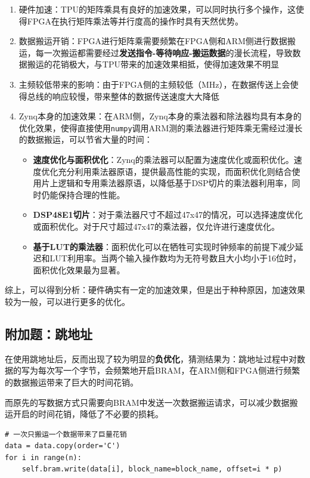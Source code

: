 \documentclass[12pt,a4paper]{article}
\begin{document}
\begin{enumerate}
\item
  硬件加速：TPU的矩阵乘具有良好的加速效果，可以同时执行多个操作，这使得FPGA在执行矩阵乘法等并行度高的操作时具有天然优势。
\item
  数据搬运开销：FPGA进行矩阵乘需要频繁在FPGA侧和ARM侧进行数据搬运，每一次搬运都需要经过\textbf{发送指令-等待响应-搬运数据}的漫长流程，导致数据搬运的花销极大，与TPU带来的加速效果相抵，使得加速效果不明显
\item
  主频较低带来的影响：由于FPGA侧的主频较低（MHz），在数据传送上会使得总线的响应较慢，带来整体的数据传送速度大大降低
\item
  Zynq本身的加速效果：在ARM侧，Zynq本身的乘法器和除法器均具有本身的优化效果，使得直接使用\texttt{numpy}调用ARM测的乘法器进行矩阵乘无需经过漫长的数据搬运，可以节省大量的时间：

  \begin{itemize}
  \item
    \textbf{速度优化与面积优化}：Zynq的乘法器可以配置为速度优化或面积优化。速度优化充分利用乘法器原语，提供最高性能的实现，而面积优化则结合使用片上逻辑和专用乘法器原语，以降低基于DSP切片的乘法器利用率，同时仍能保持合理的性能。
  \item
    \textbf{DSP48E1切片}：对于乘法器尺寸不超过47x47的情况，可以选择速度优化或面积优化。对于尺寸超过47x47的乘法器，仅允许进行速度优化。
  \item
    \textbf{基于LUT的乘法器}：面积优化可以在牺牲可实现时钟频率的前提下减少延迟和LUT利用率。当两个输入操作数均为无符号数且大小均小于16位时，面积优化效果最为显著。
  \end{itemize}
\end{enumerate}

综上，可以得到分析：硬件确实有一定的加速效果，但是出于种种原因，加速效果较为一般，可以进行更多的优化。

\subsection{附加题：跳地址}

在使用跳地址后，反而出现了较为明显的\textbf{负优化}，猜测结果为：跳地址过程中对数据的写为每次写一个字节，会频繁地开启BRAM，在ARM侧和FPGA侧进行频繁的数据搬运带来了巨大的时间花销。

而原先的写数据方式只需要向BRAM中发送一次数据搬运请求，可以减少数据搬运开启的时间花销，降低了不必要的损耗。

\begin{lstlisting}
# 一次只搬运一个数据带来了巨量花销
data = data.copy(order='C')
for i in range(n):
    self.bram.write(data[i], block_name=block_name, offset=i * p)
\end{lstlisting}
\end{document}
